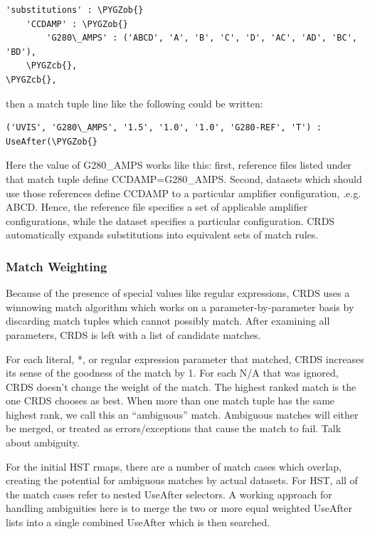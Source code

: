 \documentclass[letterpaper,10pt,english]{sphinxmanual}
\def\PYGZob{\char`\{}
\def\PYGZcb{\char`\}}
\begin{document}
\begin{Verbatim}[commandchars=\\\{\}]
'substitutions' : \PYGZob{}
    'CCDAMP' : \PYGZob{}
        'G280\_AMPS' : ('ABCD', 'A', 'B', 'C', 'D', 'AC', 'AD', 'BC', 'BD'),
    \PYGZcb{},
\PYGZcb{},
\end{Verbatim}

then a match tuple line like the following could be written:

\begin{Verbatim}[commandchars=\\\{\}]
('UVIS', 'G280\_AMPS', '1.5', '1.0', '1.0', 'G280-REF', 'T') : UseAfter(\PYGZob{}
\end{Verbatim}

Here the value of G280\_AMPS works like this:  first,   reference files listed
under that match tuple define CCDAMP=G280\_AMPS.   Second, datasets which should
use those references define CCDAMP to a particular amplifier configuration,
.e.g.  ABCD.   Hence,  the reference file specifies a set of applicable
amplifier configurations,  while the dataset specifies a particular
configuration.   CRDS automatically expands substitutions into equivalent sets
of match rules.


\subsubsection{Match Weighting}
\label{rmap_syntax:match-weighting}
Because of the presence of special values like regular expressions, CRDS uses a
winnowing match algorithm which works on a parameter-by-parameter basis by
discarding match tuples which cannot possibly match. After examining all
parameters,   CRDS is left with a list of candidate matches.

For each literal, *, or regular expression parameter that matched,  CRDS
increases its sense of the goodness of the match by 1.   For each N/A that was
ignored, CRDS doesn't change the weight of the match.   The highest ranked match
is the one CRDS chooses as best.   When more than one match tuple has the same
highest rank, we call this an ``ambiguous'' match.   Ambiguous matches will
either be merged,  or treated as errors/exceptions that cause the match to fail.
Talk about ambiguity.

For the initial HST rmaps, there are a number of match cases which overlap,
creating the potential for ambiguous matches by actual datasets.   For HST,  all
of the match cases refer to nested UseAfter selectors.  A working approach for
handling ambiguities here is to merge the two or more equal weighted UseAfter
lists into a single combined UseAfter which is then searched.
\end{document}
